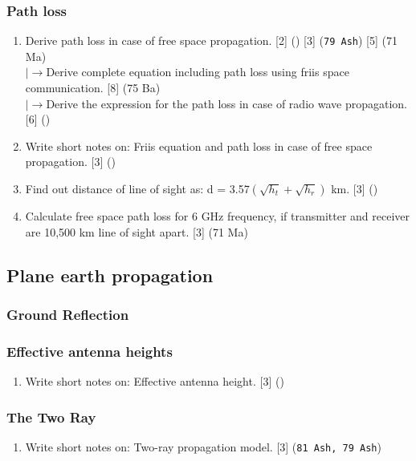 \documentclass[12pt]{article}
\newcommand{\lb}{\\$\left|\rightarrow\right.$}
\begin{document}
    \subsubsection{Path loss}
      \begin{enumerate}
        \item Derive path loss in case of free space propagation. \hfill [2] () [3] (\texttt{79 Ash}) [5] (71 Ma)
          \lb Derive complete equation including path loss using friis space communication. \hfill [8] (75 Ba)
          \lb Derive the expression for the path loss in case of radio wave propagation. \hfill [6] ()

        \item Write short notes on: Friis equation and path loss in case of free space propagation. \hfill [3] ()

        \item Find out distance of line of sight as: d = 3.57$\left( \sqrt{h_t} + \sqrt{h_r} \right)$ km. \hfill [3] ()

        \item Calculate free space path loss for 6 GHz frequency, if transmitter and receiver are 10,500 km line of sight apart. \hfill [3] (71 Ma)
      \end{enumerate}

  \subsection{Plane earth propagation}
    \subsubsection{Ground Reflection}
    \subsubsection{Effective antenna heights}
    \begin{enumerate}
      \item Write short notes on: Effective antenna height. \hfill [3] ()
    \end{enumerate}
    
    \subsubsection{The Two Ray}
      \begin{enumerate}
        \item Write short notes on: Two-ray propagation model. \hfill [3] (\texttt{81 Ash, 79 Ash})
      \end{enumerate}
\end{document}
